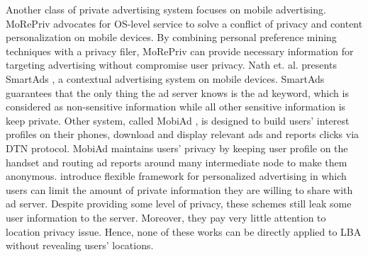 Another class of private advertising system focuses on mobile advertising. MoRePriv \cite{MoRePriv} advocates for OS-level service to solve a conflict of privacy and content personalization on mobile devices. By combining personal preference mining techniques with a privacy filer, MoRePriv can provide necessary information for targeting advertising without compromise user privacy. Nath et. al. presents SmartAds \cite{SmartAds}, a contextual advertising system on mobile devices. SmartAds guarantees that the only thing the ad server knows is the ad keyword, which is considered as non-sensitive information while all other sensitive information is keep private. Other system, called MobiAd \cite{MobiAd}, is designed to build users' interest profiles on their phones, download and display relevant ads and reports clicks via DTN protocol. MobiAd maintains users' privacy by keeping user profile on the handset and routing ad reports around many intermediate node to make them anonymous. \cite{PAPMA1, PAPMA2} introduce flexible framework for personalized advertising in which users can limit the amount of private information they are willing to share with ad server.
Despite providing some level of privacy, these schemes still leak some user information to the server. Moreover, they pay very little attention to location privacy issue. Hence, none of these works can be directly applied to LBA without revealing users' locations.

